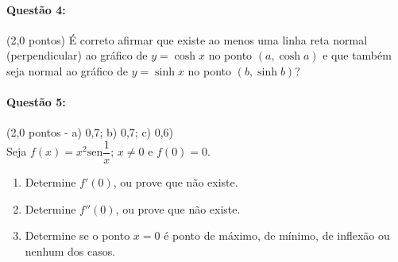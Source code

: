 \documentclass[12pt,a4paper]{article}
\newcommand{\sen}{\mathrm{sen}}
\begin{document}
\paragraph{Questão 4:} (2,0 pontos) É correto afirmar que existe ao menos uma linha reta
normal (perpendicular) ao gráfico de $y = \cosh{x}$ no ponto $\left(a, \cosh{a}\right)$ e que também seja normal ao gráfico de $y = \sinh{x}$ no ponto $\left(b, \sinh{b}\right)$?

\paragraph{Questão 5:} (2,0 pontos - a) 0,7; b) 0,7; c) 0,6) \\
Seja $f(x) = x^{2} \sen{\dfrac{1}{x}}$; $x \neq 0$ e $f(0) = 0$.
\begin{enumerate}
    \item Determine $f'(0)$, ou prove que não existe.
    \item Determine $f''(0)$, ou prove que não existe.
    \item Determine se o ponto $x = 0$ é ponto de máximo, de mínimo, de inflexão ou
    nenhum dos casos.
\end{enumerate}

\newpage
\end{document}

